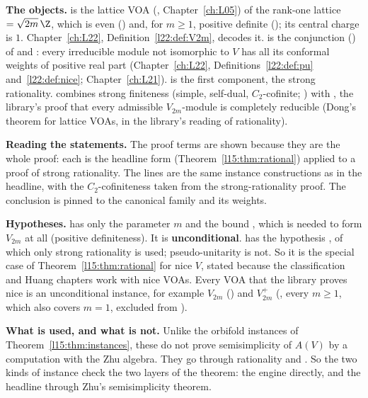 \begin{dictionary}
\textbf{The objects.}  is the lattice VOA (, Chapter~\ref{ch:L05}) of the rank-one lattice
 $=\sqrt{2m}\,\Z$, which is even () and, for $m\ge1$, positive definite ();
its central charge is $1$. Chapter~\ref{ch:L22}, Definition~\ref{l22:def:V2m}, decodes it.  is the conjunction
() of  and : every irreducible module not isomorphic to $V$ has all its
conformal weights of positive real part (Chapter~\ref{ch:L22}, Definitions~\ref{l22:def:pu} and~\ref{l22:def:nice};
Chapter~\ref{ch:L21}).  is the first component, the strong rationality.  combines strong
finiteness (simple, self-dual, $C_2$-cofinite; ) with , the library's
proof that every admissible $V_{2m}$-module is completely reducible (Dong's theorem for lattice VOAs, in the library's reading of
rationality).

\textbf{Reading the statements.} The proof terms are shown because they are the whole proof: each is the headline form
\allowbreak{}\allowbreak{} (Theorem~\ref{l15:thm:rational}) applied to
a proof of strong rationality. The  lines are the same instance constructions as in the headline, with the
$C_2$-cofiniteness taken from the strong-rationality proof. The conclusion is pinned to the canonical family and its weights.

\textbf{Hypotheses.}  has only the parameter $m$ and the bound , which is needed to form
$V_{2m}$ at all (positive definiteness). It is \textbf{unconditional}.  has the hypothesis
, of which only strong rationality is used; pseudo-unitarity is not. So it is the special case of
Theorem~\ref{l15:thm:rational} for nice $V$, stated because the classification and Huang chapters work with nice VOAs. Every
VOA that the library proves nice is an unconditional instance, for example $V_{2m}$ () and $V_{2m}^+$
(, every $m\ge1$, which also covers $m=1$, excluded from ).

\textbf{What is used, and what is not.} Unlike the orbifold instances of Theorem~\ref{l15:thm:instances}, these do not prove
semisimplicity of $A(V)$ by a computation with the Zhu algebra. They go through rationality and
\allowbreak{}\allowbreak{}. So the two kinds of instance check the two layers of the theorem: the engine
directly, and the headline through Zhu's semisimplicity theorem.


\end{dictionary}
